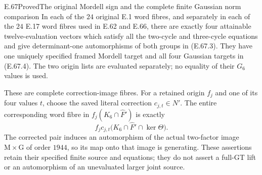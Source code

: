 \begin{statement}{E.67}{Proved}{The original Mordell sign and the complete finite Gaussian norm comparison}
In each of the $24$ original E.1 word fibres, and separately
in each of the $24$ E.17 word fibres used in E.62 and E.66,
there are exactly four attainable twelve-evaluation vectors
which satisfy all the two-cycle and three-cycle equations
and give determinant-one automorphisms of both groups in
\textup{(E.67.3)}. They have one uniquely specified framed
Mordell target and all four Gaussian targets in
\textup{(E.67.4)}. The two origin lists are evaluated separately;
no equality of their $G_6$ values is used.

These are complete correction-image fibres. For a retained
origin $f_j$ and one of its four values $t$, choose the saved
literal correction $c_{j,t}\in N'$. The entire corresponding
word fibre in $f_j(K_6\cap\widehat F')$ is exactly
\[
 f_jc_{j,t}\bigl(K_6\cap\widehat F'\cap\ker\Theta\bigr).
 \tag{E.67.7}
\]
The corrected pair induces an automorphism of the actual
two-factor image $\mathrm M\times\mathrm G$ of order $1944$,
so its map onto that image is generating. These assertions
retain their specified finite source and equations; they
do not assert a full-GT lift or an automorphism of an
unevaluated larger joint source.
\end{statement}
